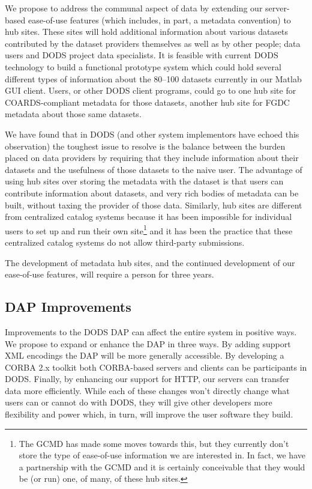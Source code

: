 \documentclass[10pt]{article}
\begin{document}
We propose to address the communal aspect of data by extending our
server-based ease-of-use features (which includes, in part, a metadata
convention) to hub sites. These sites will hold additional information about
various datasets contributed by the dataset providers themselves as well as
by other people; data users and DODS project data specialists. It is feasible
with current DODS technology to build a functional prototype system which
could hold several different types of information about the 80--100 datasets
currently in our Matlab GUI client. Users, or other DODS client programs,
could go to one hub site for COARDS-compliant metadata for those datasets,
another hub site for FGDC metadata about those same datasets.

We have found that in DODS (and other system implementors have echoed this
observation) the toughest issue to resolve is the balance between the burden
placed on data providers by requiring that they include information about
their datasets and the usefulness of those datasets to the naive user.  The
advantage of using hub sites over storing the metadata with the dataset is
that users can contribute information about datasets, and very rich bodies of
metadata can be built, without taxing the provider of those data. Similarly,
hub sites are different from centralized catalog systems because it has been
impossible for individual users to set up and run their own site\footnote{The
  GCMD has made some moves towards this, but they currently don't store the
  type of ease-of-use information we are interested in. In fact, we have a
  partnership with the GCMD and it is certainly conceivable that they would
  be (or run) one, of many, of these hub sites.} and it has been the practice
that these centralized catalog systems do not allow third-party submissions.

The development of metadata hub sites, and the continued development of our
ease-of-use features, will require a person for three years. 

\subsection{DAP Improvements}

Improvements to the DODS DAP can affect the entire system in positive ways.
We propose to expand or enhance the DAP in three ways. By adding support XML
encodings the DAP will be more generally accessible. By developing a CORBA
2.x toolkit both CORBA-based servers and clients can be participants in
DODS. Finally, by enhancing our support for HTTP, our servers can transfer
data more efficiently. While each of these changes won't directly change what
users can or cannot do with DODS, they will give other developers more
flexibility and power which, in turn, will improve the user software they
build.
\end{document}
